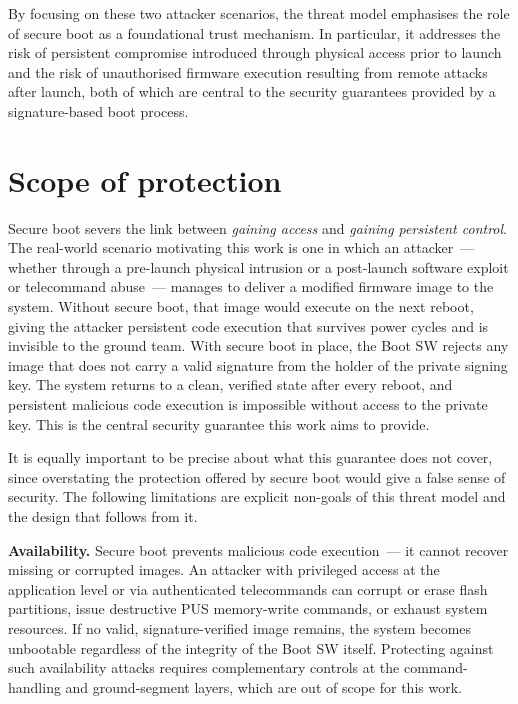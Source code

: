 \bigskip

By focusing on these two attacker scenarios, the threat model emphasises the role of secure boot as a foundational trust mechanism. In particular, it addresses the risk of persistent compromise introduced through physical access prior to launch and the risk of unauthorised firmware execution resulting from remote attacks after launch, both of which are central to the security guarantees provided by a signature-based boot process.

\section{Scope of protection}
\label{section:threatModel-scope}

Secure boot severs the link between \emph{gaining access} and \emph{gaining persistent control}. The real-world scenario motivating this work is one in which an attacker~--- whether through a pre-launch physical intrusion or a post-launch software exploit or telecommand abuse~--- manages to deliver a modified firmware image to the system. Without secure boot, that image would execute on the next reboot, giving the attacker persistent code execution that survives power cycles and is invisible to the ground team. With secure boot in place, the Boot SW rejects any image that does not carry a valid signature from the holder of the private signing key. The system returns to a clean, verified state after every reboot, and persistent malicious code execution is impossible without access to the private key. This is the central security guarantee this work aims to provide.

It is equally important to be precise about what this guarantee does not cover, since overstating the protection offered by secure boot would give a false sense of security. The following limitations are explicit non-goals of this threat model and the design that follows from it.

\textbf{Availability.} Secure boot prevents malicious code execution~--- it cannot recover missing or corrupted images. An attacker with privileged access at the application level or via authenticated telecommands can corrupt or erase flash partitions, issue destructive PUS memory-write commands, or exhaust system resources. If no valid, signature-verified image remains, the system becomes unbootable regardless of the integrity of the Boot SW itself. Protecting against such availability attacks requires complementary controls at the command-handling and ground-segment layers, which are out of scope for this work.

